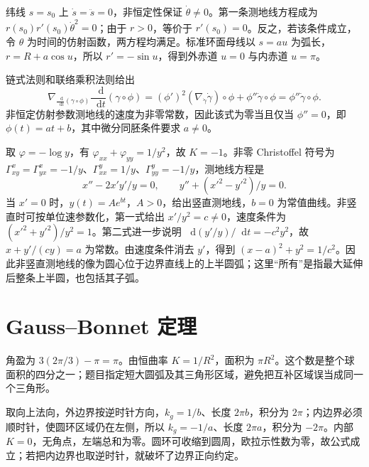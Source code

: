 \documentclass[UTF8,12pt,a4paper,fontset=fandol]{ctexbook}
\newcommand{\dd}{\mathop{}\!\mathrm d}
\begin{document}
\begin{solve}
纬线 $s=s_0$ 上 $\dot s=\ddot s=0$，非恒定性保证 $\dot\theta\ne0$。第一条测地线方程成为 $r(s_0)r'(s_0)\dot\theta^2=0$；由于 $r>0$，等价于 $r'(s_0)=0$。反之，若该条件成立，令 $\theta$ 为时间的仿射函数，两方程均满足。标准环面母线以 $s=au$ 为弧长，$r=R+a\cos u$，所以 $r'= -\sin u$，得到外赤道 $u=0$ 与内赤道 $u=\pi$。
\end{solve}

\begin{solve}
链式法则和联络乘积法则给出
\[
 \nabla_{\frac{\dd}{\dd t}(\gamma\circ\phi)}
       \frac{\dd}{\dd t}(\gamma\circ\phi)
 =(\phi')^2(\nabla_{\dot\gamma}\dot\gamma)\circ\phi
 +\phi''\dot\gamma\circ\phi
 =\phi''\dot\gamma\circ\phi.
\]
非恒定仿射参数测地线的速度为非零常数，因此该式为零当且仅当 $\phi''=0$，即 $\phi(t)=at+b$，其中微分同胚条件要求 $a\ne0$。
\end{solve}

\begin{solve}
取 $\varphi=-\log y$，有 $\varphi_{xx}+\varphi_{yy}=1/y^2$，故 $K=-1$。非零 Christoffel 符号为 $\Gamma^x_{xy}=\Gamma^x_{yx}=-1/y$、$\Gamma^y_{xx}=1/y$、$\Gamma^y_{yy}=-1/y$，测地线方程是
\[
 x''-2x'y'/y=0,\qquad y''+(x'^2-y'^2)/y=0.
\]
当 $x'=0$ 时，$y(t)=Ae^{bt}$，$A>0$，给出竖直测地线，$b=0$ 为常值曲线。非竖直时可按单位速参数化，第一式给出 $x'/y^2=c\ne0$，速度条件为 $(x'^2+y'^2)/y^2=1$。第二式进一步说明 $\dd(y'/y)/\dd t=-c^2y^2$，故 $x+y'/(cy)=a$ 为常数。由速度条件消去 $y'$，得到 $(x-a)^2+y^2=1/c^2$。因此非竖直测地线的像为圆心位于边界直线上的上半圆弧；这里“所有”是指最大延伸后整条上半圆，也包括其子弧。
\end{solve}

\section{Gauss--Bonnet 定理}
\begin{solve}
角盈为 $3(2\pi/3)-\pi=\pi$。由恒曲率 $K=1/R^2$，面积为 $\pi R^2$。这个数是整个球面积的四分之一；题目指定短大圆弧及其三角形区域，避免把互补区域误当成同一个三角形。
\end{solve}

\begin{solve}
取向上法向，外边界按逆时针方向，$k_g=1/b$、长度 $2\pi b$，积分为 $2\pi$；内边界必须顺时针，使圆环区域仍在左侧，所以 $k_g=-1/a$、长度 $2\pi a$，积分为 $-2\pi$。内部 $K=0$，无角点，左端总和为零。圆环可收缩到圆周，欧拉示性数为零，故公式成立；若把内边界也取逆时针，就破坏了边界正向约定。
\end{solve}
\end{document}
